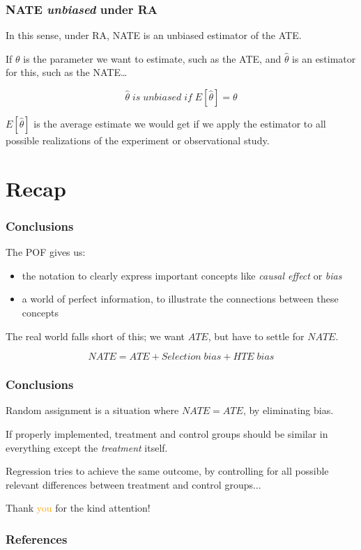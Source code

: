 \documentclass[12pt,english,dvipsnames,aspectratio=169,handout]{beamer}\usepackage[]{graphicx}\usepackage[]{xcolor}
\begin{document}
\begin{frame}
  \frametitle{NATE \textit{unbiased} under RA}
  
  In this sense, under RA, NATE is an unbiased estimator of the ATE.\bigskip
  
  If $\theta$ is the parameter we want to estimate, such as the ATE, and $\hat{\theta}$ is an estimator for this, such as the NATE\dots
  
  \begin{equation}
    \hat{\theta}\;is\;unbiased\; if\;E[\hat{\theta}] = \theta
  \end{equation}\bigskip
  
  \pause
  
  $E[\hat{\theta}]$ is the average estimate we would get if we apply the estimator to all possible realizations of the experiment or observational study.
  
\end{frame}


\section{Recap}

\begin{frame}
  \frametitle{Conclusions}
  
  The POF gives us:
  
  \begin{itemize}
    \item the notation to clearly express important concepts like \textit{causal effect} or \textit{bias}
    \item a world of perfect information, to illustrate the connections between these concepts
  \end{itemize}\bigskip
  \pause
  
  The real world falls short of this; we want $ATE$, but have to settle for $NATE$.\bigskip
  
  \begin{equation}
    NATE = ATE + Selection\;bias + HTE\;bias
  \end{equation}
  
\end{frame}


\begin{frame}
  \frametitle{Conclusions}
  
  Random assignment is a situation where $NATE = ATE$, by eliminating bias.\bigskip
  \pause
  
  If properly implemented, treatment and control groups should be similar in everything except the \textit{treatment} itself.\bigskip
  \pause
  
  Regression tries to achieve the same outcome, by controlling for all possible relevant differences between treatment and control groups...
  
\end{frame}



\begin{frame}
\begin{center}
    \Huge Thank \textcolor{orange}{you} for the kind attention!
\end{center}
\end{frame}


\begin{frame}
\frametitle{References}


\vspace{5cm}
\end{frame}
\end{document}
